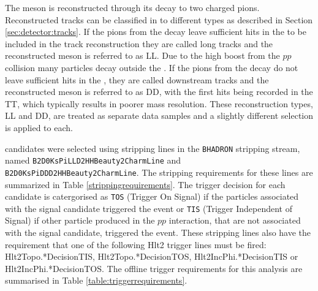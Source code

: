 The \KS meson is reconstructed through its decay to two charged pions. Reconstructed tracks can be classified in to different types as described in Section \ref{sec:detector:tracks}. If the pions from the \KS decay leave sufficient hits in the \velo to be included in the track reconstruction they are called long tracks and the reconstructed \KS meson is referred to as LL. Due to the high boost from the $pp$ collision many \KS particles decay outside the \velo. If the pions from the \KS decay do not leave sufficient hits in the \velo, they are called downstream tracks and the reconstructed \KS meson is referred to as DD, with the first hits being recorded in the TT, which typically results in poorer mass resolution. These \KS reconstruction types, LL and DD, are treated as separate data samples and a slightly different selection is applied to each.

\decay{\Bpm}{\D\Kstarpm} candidates were selected using stripping lines in the {\tt BHADRON} stripping stream, named {\tt B2D0KsPiLLD2HHBeauty2CharmLine} and {\tt B2D0KsPiDDD2HHBeauty2CharmLine}. The stripping requirements for these lines are summarized in Table \ref{strippingrequirements}. The trigger decision for each candidate is catergorised as {\tt TOS} (Trigger On Signal) if the particles associated with the signal candidate triggered the event or {\tt TIS} (Trigger Independent of Signal) if other particle produced in the $pp$ interaction, that are not associated with the signal candidate, triggered the event. These stripping lines also have the requirement that one of the following Hlt2 trigger lines must be fired: Hlt2Topo.*DecisionTIS, Hlt2Topo.*DecisionTOS, Hlt2IncPhi.*DecisionTIS or Hlt2IncPhi.*DecisionTOS. The offline trigger requirements for this analysis are summarised in Table \ref{table:triggerrequirements}.


